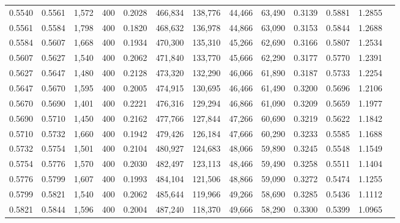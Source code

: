 \begin{tabular}{rrrrrrrrrrrrr}
0.5540 & 0.5561 &  1,572 & 400 &                                     0.2028 & 466,834 & 138,776 &  44,466 &  63,490 & 0.3139 & 0.5881 & 1.2855 \\
0.5561 & 0.5584 &  1,798 & 400 &                                     0.1820 & 468,632 & 136,978 &  44,866 &  63,090 & 0.3153 & 0.5844 & 1.2688 \\
0.5584 & 0.5607 &  1,668 & 400 &                                     0.1934 & 470,300 & 135,310 &  45,266 &  62,690 & 0.3166 & 0.5807 & 1.2534 \\
0.5607 & 0.5627 &  1,540 & 400 &                                     0.2062 & 471,840 & 133,770 &  45,666 &  62,290 & 0.3177 & 0.5770 & 1.2391 \\
0.5627 & 0.5647 &  1,480 & 400 &                                     0.2128 & 473,320 & 132,290 &  46,066 &  61,890 & 0.3187 & 0.5733 & 1.2254 \\
0.5647 & 0.5670 &  1,595 & 400 &                                     0.2005 & 474,915 & 130,695 &  46,466 &  61,490 & 0.3200 & 0.5696 & 1.2106 \\
0.5670 & 0.5690 &  1,401 & 400 &                                     0.2221 & 476,316 & 129,294 &  46,866 &  61,090 & 0.3209 & 0.5659 & 1.1977 \\
0.5690 & 0.5710 &  1,450 & 400 &                                     0.2162 & 477,766 & 127,844 &  47,266 &  60,690 & 0.3219 & 0.5622 & 1.1842 \\
0.5710 & 0.5732 &  1,660 & 400 &                                     0.1942 & 479,426 & 126,184 &  47,666 &  60,290 & 0.3233 & 0.5585 & 1.1688 \\
0.5732 & 0.5754 &  1,501 & 400 &                                     0.2104 & 480,927 & 124,683 &  48,066 &  59,890 & 0.3245 & 0.5548 & 1.1549 \\
0.5754 & 0.5776 &  1,570 & 400 &                                     0.2030 & 482,497 & 123,113 &  48,466 &  59,490 & 0.3258 & 0.5511 & 1.1404 \\
0.5776 & 0.5799 &  1,607 & 400 &                                     0.1993 & 484,104 & 121,506 &  48,866 &  59,090 & 0.3272 & 0.5474 & 1.1255 \\
0.5799 & 0.5821 &  1,540 & 400 &                                     0.2062 & 485,644 & 119,966 &  49,266 &  58,690 & 0.3285 & 0.5436 & 1.1112 \\
0.5821 & 0.5844 &  1,596 & 400 &                                     0.2004 & 487,240 & 118,370 &  49,666 &  58,290 & 0.3300 & 0.5399 & 1.0965 \\

\end{tabular}
